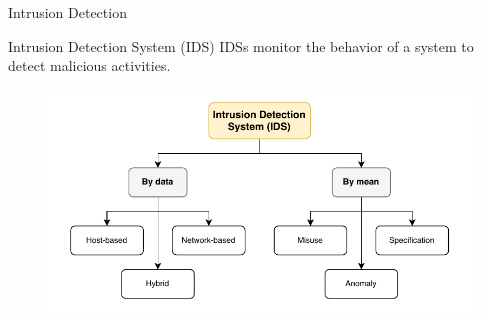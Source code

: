 

  
    

\begin{frame}{Intrusion Detection}
  \vspace{2em}
  \begin{block}{Intrusion Detection System (IDS)}
    IDSs monitor the behavior of a system to detect malicious activities.
  \end{block}

  \pause
  \begin{figure}
    \centering
    \includegraphics[width=.75\textwidth]{figures/intro/ids.pdf}
  \end{figure}
\end{frame}

